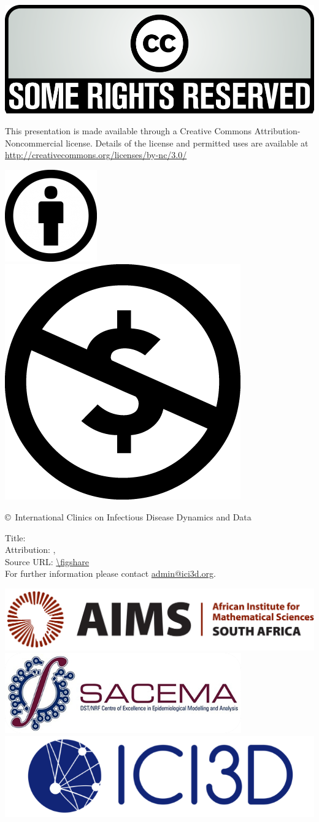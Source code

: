 
\begin{frame}[plain]

\begin{centering}

\includegraphics[height=6ex]{rights.png}

\vfill

{
	\tiny\linespread{12}
	This presentation is made available through a Creative Commons Attribution-Noncommercial license.
	Details of the license and permitted uses are available at \url{http://creativecommons.org/licenses/by-nc/3.0/} \par
}

\medskip
\includegraphics[height=3ex]{attrib.png}
\hspace{3em}
\includegraphics[height=3ex]{noncom.png}
\medskip

{\scriptsize\copyright\years\ International Clinics on Infectious Disease Dynamics and Data}

\vfill

Title: \inserttitle \\
{\footnotesize
	Attribution: \insertauthor, \insertdate \\
	{\scriptsize Source URL: \url{\figshare}} \\
	For further information please contact \url{admin@ici3d.org}.
}

\vfill

\includegraphics[height=4ex]{AIMS.jpg}
\hfill
\includegraphics[height=4ex]{sacema.png}
\hfill
\includegraphics[height=4ex]{ICI3D_logo.png}

\end{centering}

\end{frame}
